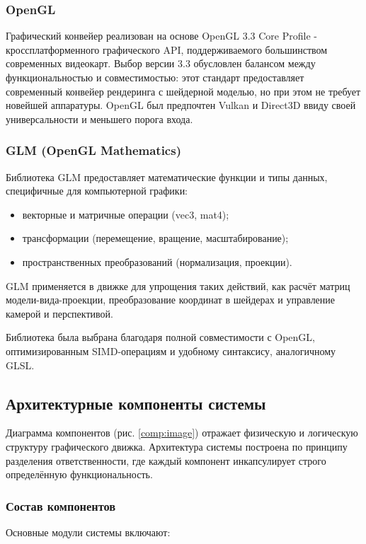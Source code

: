\subsubsection{OpenGL}

Графический конвейер реализован на основе OpenGL 3.3 Core Profile - кроссплатформенного графического API, поддерживаемого большинством современных видеокарт. Выбор версии 3.3 обусловлен балансом между функциональностью и совместимостью: этот стандарт предоставляет современный конвейер рендеринга с шейдерной моделью, но при этом не требует новейшей аппаратуры. OpenGL был предпочтен Vulkan и Direct3D ввиду своей универсальности и меньшего порога входа.

\subsubsection{GLM (OpenGL Mathematics)}

Библиотека GLM предоставляет математические функции и типы данных, специфичные для компьютерной графики:
\begin{itemize}
    \item векторные и матричные операции (vec3, mat4);
    \item трансформации (перемещение, вращение, масштабирование);
    \item пространственных преобразований (нормализация, проекции).
\end{itemize}

GLM применяется в движке для упрощения таких действий, как расчёт матриц модели-вида-проекции, преобразование координат в шейдерах и управление камерой и перспективой.

Библиотека была выбрана благодаря полной совместимости с OpenGL, оптимизированным SIMD-операциям и удобному синтаксису, аналогичному GLSL.

\subsection{Архитектурные компоненты системы}

Диаграмма компонентов (рис. \ref{comp:image}) отражает физическую и логическую структуру графического движка. Архитектура системы построена по принципу разделения ответственности, где каждый компонент инкапсулирует строго определённую функциональность.

\subsubsection{Состав компонентов}
Основные модули системы включают:

